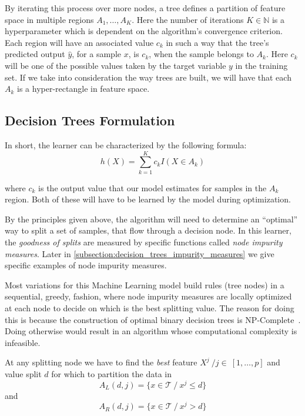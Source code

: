 By iterating this process over more nodes, a tree defines a partition of feature space in multiple regions $A_1,\ldots,A_K$.
Here the number of iterations $K \in \mathbb{N}$ is a hyperparameter which is dependent on the algorithm's convergence criterion.
Each region will have an associated value $c_k$ in such a way that the tree's predicted output $\hat{y}$, for a sample $x$, is $c_k$, when the sample belongs to $A_k$.
Here $c_k$ will be one of the possible values taken by the target variable $y$ in the training set.
If we take into consideration the way trees are built, we will have that each $A_k$ is a hyper-rectangle in feature space.

\subsection{Decision Trees Formulation}\label{subsection:decision_trees_formulation}
In short, the learner can be characterized by the following formula:
\begin{equation}
\label{eq:decisionTreeModel}
h(X) = \sum_{k=1}^K c_k I(X \in A_k)
\end{equation}

where $c_k$ is the output value that our model estimates for samples in the $A_k$ region.
Both of these will have to be learned by the model during optimization. %

By the principles given above, the algorithm will need to determine an ``optimal'' way to split a set of samples, that flow through a decision node.
In this learner, the \textit{goodness of splits} are measured by specific functions called \textit{node impurity measures}.
Later in \cref{subsection:decision_trees_impurity_measures} we give specific examples of node impurity measures.

Most variations for this Machine Learning model build rules (tree nodes) in a sequential, greedy, fashion, where node impurity measures are locally optimized at each node to decide on which is the best splitting value.
The reason for doing this is because the construction of optimal binary decision trees is NP-Complete~\citep{decisionTreesNP}.
Doing otherwise would result in an algorithm whose computational complexity is infeasible.

At any splitting node we have to find the \textit{best} feature $X^j \ / j \in \ [1, \ldots, p] $ and value split $d$ for which to partition the data in
$$A_L(d,j) = \{x \in \mathcal{T} \ / \ x^j \leq d \} $$
and
$$A_R(d,j) = \{x \in \mathcal{T}\ / \ x^j> d \} $$

